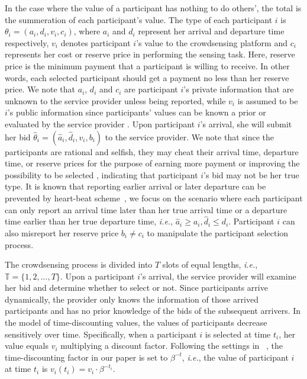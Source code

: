 \documentclass[conference,compsocconf,letterpaper,10pt]{IEEEtran}
\newcommand{\ie}{{\em i.e.}}
\begin{document}
In the case where the value of a participant has nothing to do others', the total is the summeration of each participant's value. The type of each participant $i$ is $\theta_i=(a_i,d_i,v_i,c_i)$, where $a_i$ and $d_i$ represent her arrival and departure time respectively, $v_i$ denotes participant $i$'s value to the crowdsensing platform and $c_i$ represents her cost or reserve price in performing the sensing task. Here, reserve price is the minimum payment that a participant is willing to receive. In other words, each selected participant should get a payment no less than her reserve price. We note that $a_i$, $d_i$ and $c_i$ are participant $i$'s private information that are unknown to the service provider unless being reported, while $v_i$ is assumed to be $i$'s public information since participants' values can be known a prior or evaluated by the service provider \cite{peng2015pay,jin2015quality}. Upon participant $i$'s arrival, she will submit her bid $\hat{\theta}_i=(\hat{a}_i,\hat{d}_i,v_i,b_i)$ to the service provider. We note that since the participants are rational and selfish, they may cheat their arrival time, departure time, or reserve prices for the purpose of earning more payment or improving the possibility to be selected \cite{nisan2007algorithmic}, indicating that participant $i$'s bid may not be her true type. It is known that reporting earlier arrival or later departure can be prevented by heart-beat scheme~\cite{nisan2007algorithmic}, we focus on the scenario where each participant can only report an arrival time later than her true arrival time or a departure time earlier than her true departure time, \ie, $\hat{a}_i\ge a_i, \hat{d}_i\le d_i$. Participant $i$ can also misreport her reserve price $b_i \neq c_i$ to manipulate the participant selection process.

The crowdsensing process is divided into $T$ slots of equal lengths, \ie, $\mathbb{T}=\{1,2,..., T\}$. Upon a participant $i$'s arrival, the service provider will examine her bid and determine whether to select or not. Since participants arrive dynamically, the provider only knows the information of those arrived participants and has no prior knowledge of the bids of the subsequent arrivers. In the model of time-discounting values, the values of participants decrease sensitively over time. Specifically, when a participant $i$ is selected at time $t_i$, her value equals $v_i$ multiplying a discount factor. Following the settings in ~\cite{rasmussen1975choosing}, the time-discounting factor in our paper is set to $\beta^{-t}$, \ie, the value of participant $i$ at time $t_i$ is $v_i(t_i)=v_i \cdot \beta^{-t_i}$.
\end{document}
